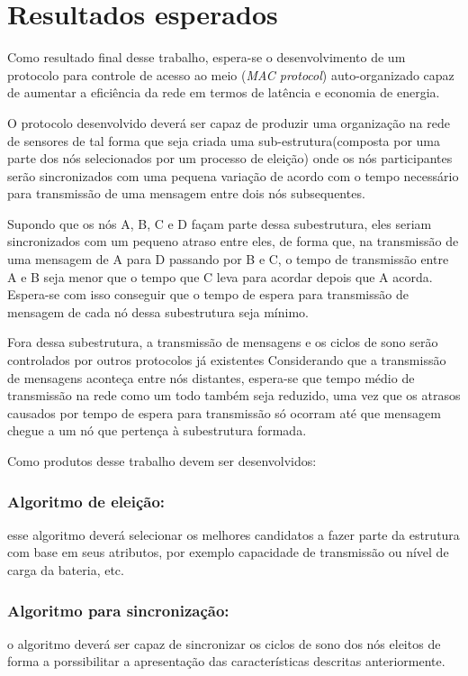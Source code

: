 \section{Resultados esperados}

Como resultado final desse trabalho, espera-se o desenvolvimento de um protocolo para controle de acesso ao meio (\textit{MAC protocol}) auto-organizado capaz de aumentar a eficiência da rede em termos de latência e economia de energia. 

O protocolo desenvolvido deverá ser capaz de produzir uma organização na rede de sensores de tal forma que seja criada uma sub-estrutura(composta por uma parte dos nós selecionados por um processo de eleição) onde os nós participantes serão sincronizados com uma pequena variação de acordo com o tempo necessário para transmissão de uma mensagem entre dois nós subsequentes. 

Supondo que os nós A, B, C e D façam parte dessa subestrutura, eles seriam sincronizados com um pequeno atraso entre eles, de forma que, na transmissão de uma mensagem de A para D passando por B e C, o tempo de transmissão entre A e B seja menor que o tempo que C leva para acordar depois que A acorda. Espera-se com isso conseguir que o tempo de espera para transmissão de mensagem de cada nó dessa subestrutura seja mínimo. 

Fora dessa subestrutura, a transmissão de mensagens e os ciclos de sono serão controlados por outros protocolos já existentes Considerando que a transmissão de mensagens aconteça entre nós distantes, espera-se que tempo médio de transmissão na rede como um todo também seja reduzido, uma vez que os atrasos causados por tempo de espera para transmissão só ocorram até que mensagem chegue a um nó que pertença à subestrutura formada. 

Como produtos desse trabalho devem ser desenvolvidos:
 
 \subsubsection{Algoritmo de eleição:} esse algoritmo deverá selecionar os melhores candidatos a fazer parte da estrutura com base em seus atributos, por exemplo capacidade de transmissão ou nível de carga da bateria, etc.
 
 \subsubsection{Algoritmo para sincronização:} o algoritmo deverá ser capaz de sincronizar os ciclos de sono dos nós eleitos de forma a porssibilitar a apresentação das características descritas anteriormente.
 
